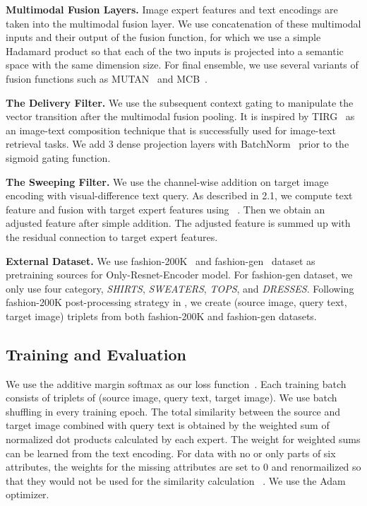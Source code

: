 \documentclass[10pt,twocolumn,letterpaper]{article}
\begin{document}
\textbf{Multimodal Fusion Layers.}
Image expert features and text encodings are taken into the multimodal fusion layer.
We use concatenation of these multimodal inputs and their output of the fusion function, for which we use a simple Hadamard product so that each of the two inputs is projected into a semantic space with the same dimension size.
For final ensemble, we use several variants of fusion functions such as MUTAN~\cite{mutan-iccv-2017} and MCB~\cite{mcb-emnlp-2016}. 

\textbf{The Delivery Filter.}
We use the subsequent context gating to manipulate the vector transition after the multimodal fusion pooling. 
It is inspired by TIRG~\cite{vo-cvpr-2019} as an image-text composition technique that is successfully used for image-text retrieval tasks.
We add 3 dense projection layers with BatchNorm~\cite{Sergey-icml-2015} prior to the sigmoid gating function.

\textbf{The Sweeping Filter.}
We use the channel-wise addition on target image encoding with visual-difference text query.
As described in 2.1, we compute text feature and fusion with target expert features using ~\cite{mutan-iccv-2017}. Then we obtain an adjusted feature after simple addition. The adjusted feature is summed up with the residual connection to target expert features.



\textbf{External Dataset.}
We use fashion-200K~\cite{han-iccv-2017} and fashion-gen~\cite{arxiv-fashiongen-2018} dataset as pretraining sources for Only-Resnet-Encoder model.
For fashion-gen dataset, we only use four category, \textit{SHIRTS}, \textit{SWEATERS}, \textit{TOPS}, and \textit{DRESSES}.
Following fashion-200K post-processing strategy in \cite{vo-cvpr-2019}, we create (source image, query text, target image) triplets from both fashion-200K and fashion-gen datasets.


\subsection{Training and Evaluation}
We use the additive margin softmax as our loss function~\cite{amloss-arxiv-2019}.
Each training batch consists of  triplets of (source image, query text, target image).
We use batch shuffling in every training epoch.
The total similarity between the source and target image combined with query text is obtained by the weighted sum of normalized dot products calculated by each expert. 
The weight for weighted sums can be learned from the text encoding. For data with no or only parts of six attributes, the weights for the missing attributes are set to 0 and renormailized so that they would not be used for the similarity calculation~ \cite{Liu-bmvc-2019}.
We use the Adam~\cite{kingma-iclr-2015} optimizer. 
\end{document}
